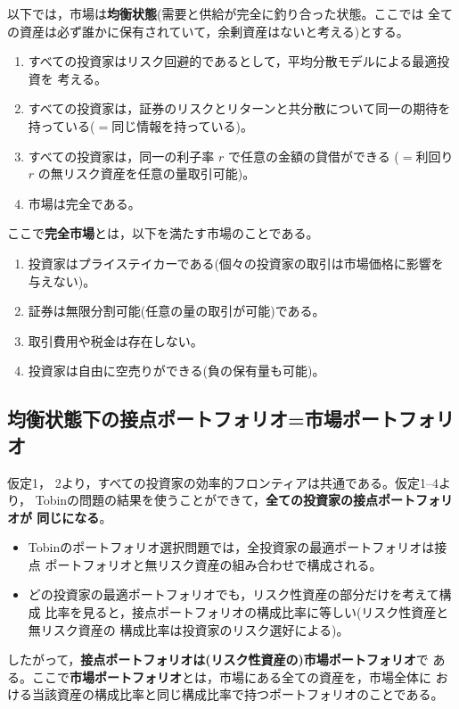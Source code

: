 以下では，市場は\textbf{均衡状態}(需要と供給が完全に釣り合った状態。ここでは
全ての資産は必ず誰かに保有されていて，余剰資産はないと考える)とする。

\begin{keypoint}[CAPMの仮定]
\begin{enumerate}
\item すべての投資家はリスク回避的であるとして，平均分散モデルによる最適投資を
考える。
\item すべての投資家は，証券のリスクとリターンと共分散について同一の期待を
持っている($=$同じ情報を持っている)。
\item すべての投資家は，同一の利子率 $r$ で任意の金額の貸借ができる
($=$利回り $r$ の無リスク資産を任意の量取引可能)。
\item 市場は完全である。
\end{enumerate}
\end{keypoint}

ここで\textbf{完全市場}とは，以下を満たす市場のことである。
\begin{enumerate}
\item[①] 投資家はプライステイカーである(個々の投資家の取引は市場価格に影響を
与えない)。
\item[②] 証券は無限分割可能(任意の量の取引が可能)である。
\item[③] 取引費用や税金は存在しない。
\item[④] 投資家は自由に空売りができる(負の保有量も可能)。
\end{enumerate}

\subsection{均衡状態下の接点ポートフォリオ=市場ポートフォリオ}

仮定1， 2より，すべての投資家の効率的フロンティアは共通である。仮定1--4より，
Tobinの問題の結果を使うことができて，\textbf{全ての投資家の接点ポートフォリオが
同じになる}。
\begin{itemize}
\item Tobinのポートフォリオ選択問題では，全投資家の最適ポートフォリオは接点
ポートフォリオと無リスク資産の組み合わせで構成される。
\item どの投資家の最適ポートフォリオでも，リスク性資産の部分だけを考えて構成
比率を見ると，接点ポートフォリオの構成比率に等しい(リスク性資産と無リスク資産の
構成比率は投資家のリスク選好による)。
\end{itemize}
したがって，\textbf{接点ポートフォリオは(リスク性資産の)市場ポートフォリオ}で
ある。ここで\textbf{市場ポートフォリオ}とは，市場にある全ての資産を，市場全体に
おける当該資産の構成比率と同じ構成比率で持つポートフォリオのことである。

